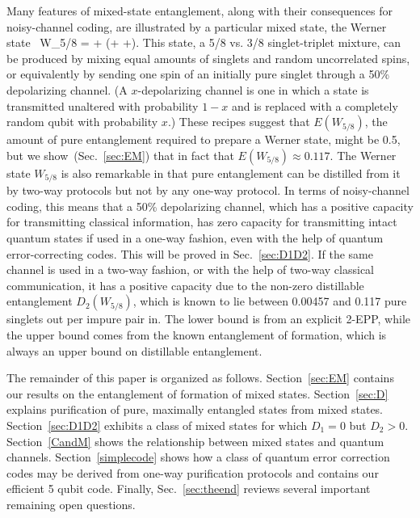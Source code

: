 Many features of mixed-state entanglement, along with their consequences
for noisy-channel coding, are illustrated by a particular mixed state,
the Werner state~\cite{Werner}
\beq
W_{5/8} = \proj{\Psi^-}
+ (\proj{\Psi^+}+ \proj{\Phi^+}+\proj{\Phi^-}).\label{W58}
\eeq
This state, a 5/8 vs. 3/8 singlet-triplet mixture, can be produced by
mixing equal amounts of singlets and random uncorrelated spins, or
equivalently by sending one spin of an initially pure singlet through a
50\% depolarizing channel.  (A $x$-depolarizing channel is one in
which a state is transmitted unaltered with probability $1-x$ and
is replaced with a completely random qubit with probability $x$.) 
These recipes suggest that $E(W_{5/8})$, the
amount of pure entanglement required to prepare a Werner state, might
be 0.5, but we show~(Sec.~\ref{sec:EM}) that in fact that
$E(W_{5/8})\approx 0.117$.  The Werner state $W_{5/8}$ is also remarkable
in that pure entanglement can be distilled from it by two-way protocols
but not by any one-way protocol.  In terms of noisy-channel coding, this
means that a 50\% depolarizing channel, which has a positive capacity
for transmitting classical information, has zero capacity for
transmitting intact quantum states if used in a one-way fashion, even
with the help of quantum error-correcting codes.  This will be proved
in Sec.~\ref{sec:D1D2}.  If the same channel is
used in a two-way fashion, or with the help of two-way classical
communication, it has a positive capacity due to the non-zero
distillable entanglement $D_2(W_{5/8})$, which is known to lie between
0.00457 and 0.117 pure singlets out per impure pair in.  The lower bound
is from an explicit 2-EPP, while the upper bound comes from the known
entanglement of formation, which is always an upper bound on distillable
entanglement.
 
The remainder of this paper is organized as follows.  Section~\ref{sec:EM} 
contains our results on the entanglement of formation of
mixed states.  Section~\ref{sec:D} explains
purification of pure, maximally entangled states from mixed states.  
Section~\ref{sec:D1D2} exhibits a class of mixed states for 
which $D_1=0$ but $D_2>0$.  Section~\ref{CandM} shows the
relationship between mixed states and quantum channels.
Section~\ref{simplecode} shows how a class of quantum error 
correction codes may be derived from one-way purification protocols 
and contains our efficient 5 qubit code.  
Finally, Sec.~\ref{sec:theend} reviews several important remaining open 
questions.
 
